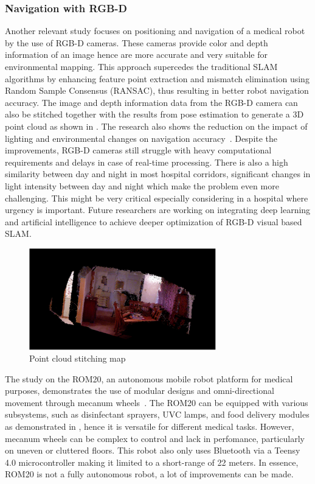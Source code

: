 \subsubsection{Navigation with RGB-D}
\noindent Another relevant study focuses on positioning and navigation of a medical robot by the use of
RGB-D cameras. These cameras provide color and depth information of an image hence are more accurate and 
very suitable for environmental mapping. This approach supercedes the traditional SLAM algorithms by 
enhancing feature point extraction and mismatch elimination using Random Sample Consensus (RANSAC), thus resulting in better robot
navigation accuracy. The image and depth information data from the RGB-D camera can also be stitched together
with the results from pose estimation to generate a 3D point cloud as shown in .
The research also shows the reduction on the impact of lighting and environmental changes
on navigation accuracy~\cite{jia2023rgbd}. Despite the improvements, RGB-D cameras still struggle with heavy computational
requirements and delays in case of real-time processing. There is also a high similarity between day and 
night in most hospital corridors, significant changes in light intensity between day and night which make
the problem even more challenging. This might be very critical especially considering
in a hospital where urgency is important. Future researchers are working on integrating deep learning and
artificial intelligence to achieve deeper optimization of RGB-D  visual based SLAM\cite{makhubela2023vslam}.


\begin{figure}[H]
    \centering
    \includegraphics[width=3.2in ]{pics/pcl_stitch.png}
    \caption[Point cloud stitching map]{Point cloud stitching map~\cite{makhubela2023vslam}}\label{pcl_stitch}
\end{figure}

\noindent The study on the ROM20, an autonomous mobile robot platform for medical purposes, demonstrates
the use of modular designs and omni-directional movement through mecanum wheels~\cite{baskoro2020autonomous}.
The ROM20 can be equipped
with various subsystems, such as disinfectant sprayers, UVC lamps, and food delivery modules as demonstrated in , hence it is versatile
for different medical tasks. However, mecanum wheels can be complex to control and lack in perfomance,
particularly on uneven or cluttered floors. This robot also only uses Bluetooth via a Teensy 4.0 microcontroller
making it limited to a short-range of 22 meters. In essence, ROM20 is not a fully autonomous robot, a 
lot of improvements can be made. 


